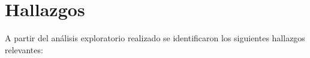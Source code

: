 \chapter{Hallazgos}

A partir del análisis exploratorio realizado se identificaron los siguientes hallazgos relevantes:

